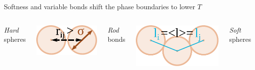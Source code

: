 \documentclass[aspectratio=169]{beamer}
\begin{document}
\begin{frame}[c]{Softness and variable bonds shift the phase boundaries to lower $T$}

  \begin{columns}[T]


  \vspace{1.3\baselineskip}

    \begin{columns}[T]


      \centering

      \textcolor{FigGreen}{\Large \emph{Hard} spheres}
      \vspace{.5\baselineskip}

      \includegraphics[scale=0.65]{../figures/fig-all_potentials/fig-pairs/fig-pair_hard.pdf}


      \centering
      \textcolor{FigOrange}{\Large \emph{Rod} bonds}
      \vspace{.5\baselineskip}

      \includegraphics[scale=0.65]{../figures/fig-all_potentials/fig-bonds/fig-bond_rod.pdf}

    \end{columns}

    \vspace{1.3\baselineskip}

    \begin{columns}[T]


      \centering
      \textcolor{FigGreen}{\Large \emph{Soft} spheres}
      \vspace{0.5\baselineskip}


\end{columns}
\end{columns}
\end{frame}
\end{document}
